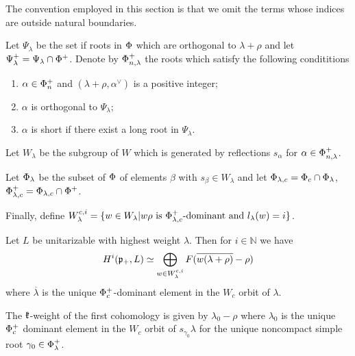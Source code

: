 The convention employed in this section is that we omit the terms whose indices are outside natural boundaries. 

\begin{definition}\label{def:cohomology_roots}
Let $\Psi_\lambda$ be the set if roots in $\Phi$ which are orthogonal to $\lambda+\rho$ and let $\Psi_\lambda^+ = \Psi_\lambda \cap \Phi^+$. Denote by $\Phi_{n,\lambda}^+$ the roots which satisfy the following condititions
 \begin{enumerate}
    \item $\alpha \in \Phi_n^+$ and $(\lambda+\rho,\alpha^\vee)$ is a positive integer;
    \item $\alpha$ is orthogonal to $\Psi_\lambda$;
    \item $\alpha$ is short if there exist a long root in $\Psi_\lambda$.
 \end{enumerate}
 
 Let $W_\lambda$ be the subgroup of $W$ which is generated by reflections $s_\alpha$ for $\alpha\in \Phi_{n,\lambda}^+$.
 
 Let $\Phi_\lambda$ be the subset of $\Phi$ of elements $\beta$ with $s_\beta\in W_\lambda$ and let $\Phi_{\lambda,c} = \Phi_c \cap \Phi_\lambda$, $\Phi_{\lambda,c}^+ = \Phi_{\lambda,c} \cap \Phi^+$.
 
 Finally, define  $W^{c,i}_\lambda = \{ w \in W_\lambda | w \rho \text{ is } \Phi^+_{\lambda, c}\text{-dominant and } l_\lambda(w)=i \}$.
\end{definition}


\begin{theorem}\label{thm:cohomology}
 Let $L$ be unitarizable with highest weight $\lambda $. Then for $i\in \mathbb{N}$ we have
\[
 H^i(\mathfrak{p}_+,L)\simeq \bigoplus_{w\in W^{c,i}_\lambda} F(\overline{w(\lambda+\rho)} - \rho)
\]
where  $\overline{\lambda}$ is the unique $\Phi_c^+$-dominant element in the $W_c$ orbit of $\lambda$.
\end{theorem}

\begin{remark}
 The $\mathfrak{k}$-weight of the first cohomology is given by $\lambda_0-\rho$ where $\lambda_0$ is the unique $\Phi_c^+$ dominant element in the $W_c$ orbit of $s_{\gamma_0}\lambda$ for the unique noncompact simple root $\gamma_0 \in \Phi_\lambda^+$.
\end{remark}

